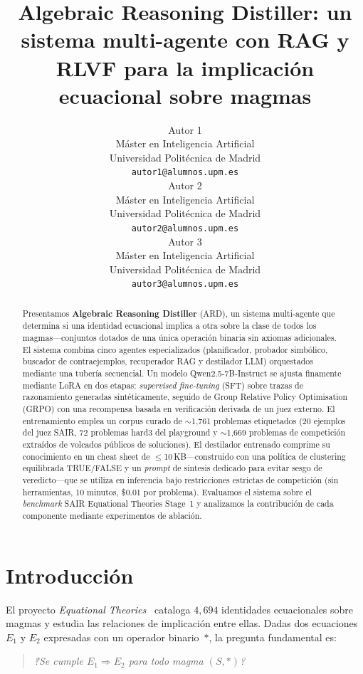 \documentclass{article}
\title{Algebraic Reasoning Distiller: un sistema multi-agente con RAG y RLVF para la implicaci\'on ecuacional sobre magmas}
\author{%
  Autor 1 \\
  M\'aster en Inteligencia Artificial\\
  Universidad Polit\'ecnica de Madrid\\
  \texttt{autor1@alumnos.upm.es} \\
  \And
  Autor 2 \\
  M\'aster en Inteligencia Artificial\\
  Universidad Polit\'ecnica de Madrid\\
  \texttt{autor2@alumnos.upm.es} \\
  \And
  Autor 3 \\
  M\'aster en Inteligencia Artificial\\
  Universidad Polit\'ecnica de Madrid\\
  \texttt{autor3@alumnos.upm.es} \\
}
\begin{document}
\maketitle

\begin{abstract}
Presentamos \textbf{Algebraic Reasoning Distiller} (ARD), un sistema multi-agente que determina si una identidad ecuacional implica a otra sobre la clase de todos los magmas---conjuntos dotados de una \'unica operaci\'on binaria sin axiomas adicionales. El sistema combina cinco agentes especializados (planificador, probador simb\'olico, buscador de contraejemplos, recuperador RAG y destilador LLM) orquestados mediante una tuber\'ia secuencial. Un modelo Qwen2.5-7B-Instruct se ajusta finamente mediante LoRA en dos etapas: \textit{supervised fine-tuning} (SFT) sobre trazas de razonamiento generadas sint\'eticamente, seguido de Group Relative Policy Optimisation (GRPO) con una recompensa basada en verificaci\'on derivada de un juez externo. El entrenamiento emplea un corpus curado de $\sim$1{,}761 problemas etiquetados (20 ejemplos del juez SAIR, 72 problemas hard3 del playground y $\sim$1{,}669 problemas de competici\'on extra\'idos de volcados p\'ublicos de soluciones). El destilador entrenado comprime su conocimiento en un cheat sheet de $\leq$10\,KB---construido con una pol\'itica de clustering equilibrada TRUE/FALSE y un \textit{prompt} de s\'intesis dedicado para evitar sesgo de veredicto---que se utiliza en inferencia bajo restricciones estrictas de competici\'on (sin herramientas, 10 minutos, \$0.01 por problema). Evaluamos el sistema sobre el \textit{benchmark} SAIR Equational Theories Stage~1 y analizamos la contribuci\'on de cada componente mediante experimentos de ablaci\'on.
\end{abstract}

\section{Introducci\'on}
\label{sec:intro}

El proyecto \textit{Equational Theories}~\cite{teorth2024} cataloga $4{,}694$ identidades ecuacionales sobre magmas y estudia las relaciones de implicaci\'on entre ellas. Dadas dos ecuaciones $E_1$ y $E_2$ expresadas con un operador binario~$*$, la pregunta fundamental es:

\begin{quote}
\itshape \'?Se cumple $E_1 \Rightarrow E_2$ para todo magma $(S, *)$?
\end{quote}
\end{document}
